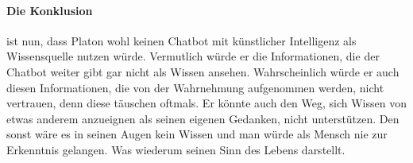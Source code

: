 \paragraph{Die Konklusion} ist nun, dass Platon wohl keinen Chatbot mit künstlicher Intelligenz als Wissensquelle nutzen würde. Vermutlich würde er die Informationen, die der Chatbot  weiter gibt gar nicht als Wissen ansehen. Wahrscheinlich würde er auch diesen Informationen, die von der Wahrnehmung aufgenommen werden, nicht vertrauen, denn diese täuschen oftmals. Er könnte auch den Weg, sich Wissen von etwas anderem anzueignen als seinen eigenen Gedanken, nicht unterstützen. Den sonst wäre es in seinen Augen kein Wissen und man würde als Mensch nie zur Erkenntnis gelangen. Was wiederum seinen Sinn des Lebens darstellt.     






